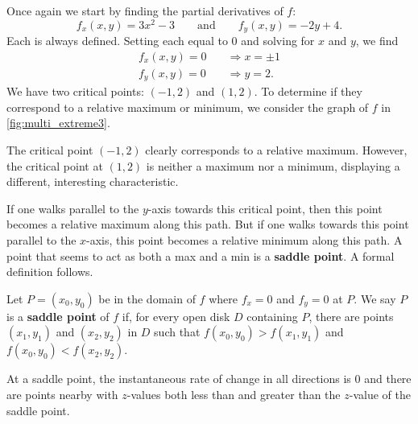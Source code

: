 {Once again we start by finding the partial derivatives of $f$:
$$f_x(x,y) = 3x^2-3\qquad \text{and} \qquad f_y(x,y) = -2y+4.$$
Each is always defined. Setting each equal to 0 and solving for $x$ and $y$, we find
\begin{align*}
f_x(x,y) = 0 \quad &\Rightarrow x=\pm 1\\
f_y(x,y) = 0\quad &\Rightarrow y = 2.
\end{align*}
We have two critical points: $(-1,2)$ and $(1,2)$. To determine if they correspond to a relative maximum or minimum, we consider the graph of $f$ in \autoref{fig:multi_extreme3}.

The critical point $(-1,2)$ clearly corresponds to a relative maximum. However, the critical point at $(1,2)$ is neither a maximum nor a minimum, displaying a different, interesting characteristic. 

If one walks parallel to the $y$-axis towards this critical point, then this point becomes a relative maximum along this path. But if one walks towards this point parallel to the $x$-axis, this point becomes a relative minimum along this path. A point that seems to act as both a max and a min is a \textbf{saddle point}. A formal definition follows.}

{Let $P=(x_0,y_0)$ be in the domain of $f$ where $f_x=0$ and $f_y=0$ at $P$. We say $P$ is a \textbf{saddle point} of $f$ if, for every open disk $D$ containing $P$, there are points $(x_1,y_1)$ and $(x_2,y_2)$ in $D$ such that $f(x_0,y_0)>f(x_1,y_1)$ and $f(x_0,y_0)<f(x_2,y_2)$.
}

At a saddle point, the instantaneous rate of change in all directions is 0 and there are points nearby with $z$-values both less than and greater than the $z$-value of the saddle point.

